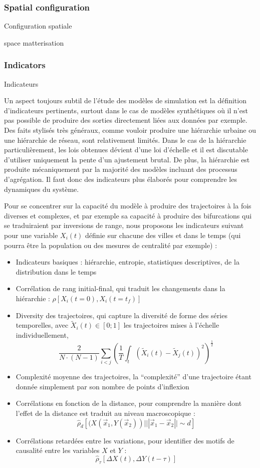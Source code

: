\subsubsection{Spatial configuration}{Configuration spatiale}

space matterisation

\subsubsection{Indicators}{Indicateurs}

Un aspect toujours subtil de l'étude des modèles de simulation est la définition d'indicateurs pertinents, surtout dans le cas de modèles synthétiques où il n'est pas possible de produire des sorties directement liées aux données par exemple. Des faits stylisés très généraux, comme vouloir produire une hiérarchie urbaine ou une hiérarchie de réseau, sont relativement limités. Dans le cas de la hiérarchie particulièrement, les lois obtenues dévient d'une loi d'échelle et il est discutable d'utiliser uniquement la pente d'un ajustement brutal. De plus, la hiérarchie est produite mécaniquement par la majorité des modèles incluant des processus d'agrégation. Il faut donc des indicateurs plus élaborés pour comprendre les dynamiques du système.


Pour se concentrer sur la capacité du modèle à produire des trajectoires à la fois diverses et complexes, et par exemple sa capacité à produire des bifurcations qui se traduiraient par inversions de range, nous proposons les indicateurs suivant pour une variable $X_i(t)$ définie sur chacune des villes et dans le temps (qui pourra être la population ou des mesures de centralité par exemple) :

\begin{itemize}
  \item Indicateurs basiques : hiérarchie, entropie, statistiques descriptives, de la distribution dans le temps
  \item Corrélation de rang initial-final, qui traduit les changements dans la hiérarchie : $\rho\left[X_i(t=0),X_i(t=t_f)\right]$
  \item Diversity des trajectoires, qui capture la diversité de forme des séries temporelles, avec $\tilde{X}_i(t)\in \left[0;1\right]$ les trajectoires mises à l'échelle individuellement,
\[
\frac{2}{N\cdot(N-1)}\sum_{i<j} \left(\frac{1}{T}\int_{t} \left(\tilde{X}_i(t) - \tilde{X}_j(t)\right)^2 \right)^{\frac{1}{2}}
\]
\item Complexité moyenne des trajectoires, la ``complexité'' d'une trajectoire étant donnée simplement par son nombre de points d'inflexion
\item Corrélations en fonction de la distance, pour comprendre la manière dont l'effet de la distance est traduit au niveau macroscopique : 
\[
\hat{\rho}_d\left[(X(\vec{x}_1,Y(\vec{x}_2))|||\vec{x}_1-\vec{x}_2||\sim d\right]
\]
\item Corrélations retardées entre les variations, pour identifier des motifs de causalité entre les variables $X$ et $Y$ : \[
\hat{\rho}_{\tau}\left[\Delta X(t),\Delta Y(t-\tau)\right]
\]
\end{itemize}




